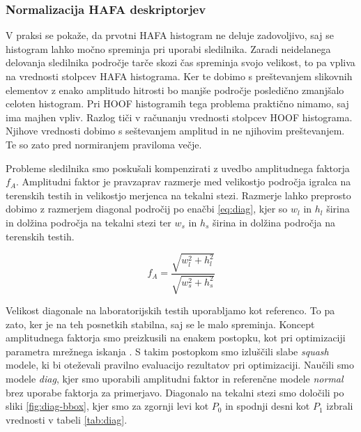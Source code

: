 




\subsubsection{Normalizacija HAFA deskriptorjev}
V praksi se pokaže, da prvotni HAFA histogram ne deluje zadovoljivo, saj se histogram lahko močno spreminja pri uporabi sledilnika. Zaradi neidelanega delovanja sledilnika področje tarče skozi čas spreminja svojo velikost, to pa vpliva na vrednosti stolpcev HAFA histograma. Ker te dobimo s preštevanjem slikovnih elementov z enako amplitudo hitrosti bo manjše področje posledično zmanjšalo celoten histogram. Pri HOOF histogramih tega problema praktično nimamo, saj ima majhen vpliv. Razlog tiči v računanju vrednosti stolpcev HOOF histograma. Njihove vrednosti dobimo s seštevanjem amplitud in ne njihovim preštevanjem. Te so zato pred normiranjem praviloma večje.

Probleme sledilnika smo poskušali kompenzirati z uvedbo amplitudnega faktorja $f_A$. Amplitudni faktor je pravzaprav razmerje med velikostjo področja igralca na terenskih testih in velikostjo merjenca na tekalni stezi. Razmerje lahko preprosto dobimo z razmerjem diagonal področij po enačbi \eqref{eq:diag}, kjer so $w_l$ in $h_l$ širina in dolžina področja na tekalni stezi ter $w_s$ in $h_s$ širina in dolžina področja na terenskih testih.

\begin{equation}
f_A = \frac{\sqrt{w_l^2 + h_l^2}}{\sqrt{w_s^2 + h_s^2}}
\label{eq:diag}
\end{equation}

Velikost diagonale na laboratorijskih testih uporabljamo kot referenco. To pa zato, ker je na teh posnetkih stabilna, saj se le malo spreminja. Koncept amplitudnega faktorja smo preizkusili na enakem postopku, kot pri optimizaciji parametra mrežnega iskanja \nurbf. S takim postopkom smo izluščili slabe \textit{squash} modele, ki bi oteževali pravilno evaluacijo rezultatov pri optimizaciji. Naučili smo modele \textit{diag}, kjer smo uporabili amplitudni faktor in referenčne modele \textit{normal} brez uporabe faktorja za primerjavo. Diagonalo na tekalni stezi smo določili po sliki \ref{fig:diag-bbox}, kjer smo za zgornji levi kot $P_0$ in spodnji desni kot $P_1$ izbrali vrednosti v tabeli \ref{tab:diag}. 



